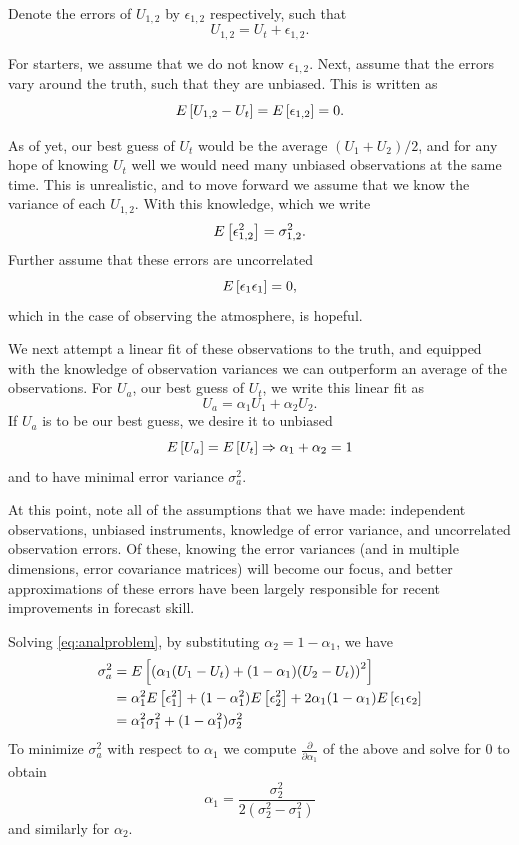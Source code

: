 \documentclass[12pt]{report}
\begin{document}
Denote the errors of $U_{1,2}$ by $\epsilon _{1,2}$ respectively, such that
$$ U_{1,2} = U_t + \epsilon _{1,2} .$$

For starters, we assume that we do not know $\epsilon _{1,2}$.
Next, assume that the errors vary around the truth, such that they are unbiased.
This is written as
\begin{equation*} E \left [ U_{1,2}-U_t \right ] = E \left [ \epsilon _{1,2}  \right ] = 0. \end{equation*}

As of yet, our best guess of $U_t$ would be the average $(U_1 + U_2)/2$, and for any hope of knowing $U_t$ well we would need many unbiased observations at the same time.
This is unrealistic, and to move forward we assume that we know the variance of each $U_{1,2}$.
With this knowledge, which we write
\begin{equation} E \left [ \epsilon _{1,2} ^2 \right ] = \sigma _{1,2} ^2 .\end{equation}
Further assume that these errors are uncorrelated
\begin{equation} E \left [ \epsilon _1 \epsilon _1 \right ] = 0, \end{equation}
which in the case of observing the atmosphere, is hopeful.

We next attempt a linear fit of these observations to the truth, and equipped with the knowledge of observation variances we can outperform an average of the observations.
For $U_a$, our best guess of $U_t$, we write this linear fit as
\begin{equation} U_a = \alpha _1 U_1 + \alpha _2 U_2 \label{eq:analproblem}. \end{equation}
If $U_a$ is to be our best guess, we desire it to unbiased
\begin{equation*} E \left [ U_a \right ] = E \left [ U_t \right ] \Rightarrow \alpha _1 + \alpha _2 = 1\end{equation*}
and to have minimal error variance $\sigma _a ^2$.

At this point, note all of the assumptions that we have made: independent observations, unbiased instruments, knowledge of error variance, and uncorrelated observation errors.
Of these, knowing the error variances (and in multiple dimensions, error covariance matrices) will become our focus, and better approximations of these errors have been largely responsible for recent improvements in forecast skill.

Solving \ref{eq:analproblem}, by substituting $\alpha _2 = 1 - \alpha _1$, we have
\begin{align*} \sigma _a ^2 &= E \left [  \left ( \alpha_1 (U_1-U_t)+(1-\alpha_1)(U_2 - U_t) \right ) ^2  \right ] \\
&= \alpha_1^2  E \left [  \epsilon _1 ^2  \right ] + (1-\alpha _1^2) E \left [  \epsilon _2 ^2 \right ] + 2\alpha _1 (1- \alpha _1) E \left [ \epsilon _1 \epsilon _2 \right ] \\
&=\alpha _1 ^2 \sigma_1 ^2 + (1-\alpha _1 ^2) \sigma _2^2\end{align*}
To minimize $\sigma _a^2$ with respect to $\alpha _1$ we compute $\frac{\partial }{\partial \alpha _1}$ of the above and solve for 0 to obtain
$$ \alpha _1 = \frac{\sigma _2 ^2}{2(\sigma_2^2 - \sigma _1^2)} $$
and similarly for $\alpha _2$.
\end{document}
